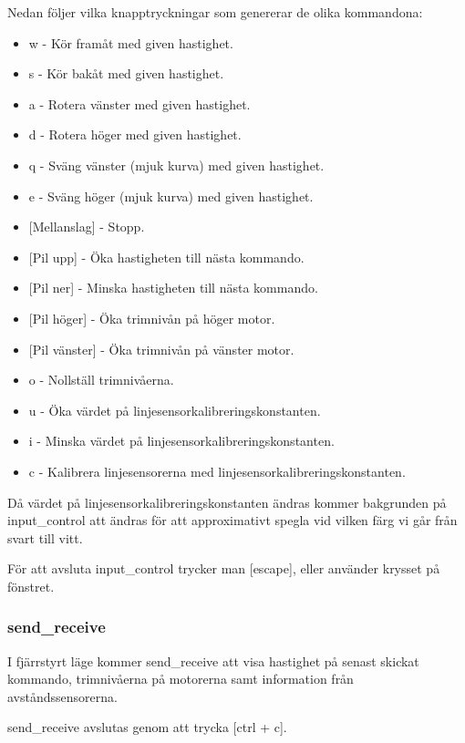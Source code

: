Nedan följer vilka knapptryckningar som genererar de olika kommandona:

\begin{itemize}
\item w - Kör framåt med given hastighet.
\item s - Kör bakåt med given hastighet.
\item a - Rotera vänster med given hastighet.
\item d - Rotera höger med given hastighet.
\item q - Sväng vänster (mjuk kurva) med given hastighet.
\item e - Sväng höger (mjuk kurva) med given hastighet.
\item {[}Mellanslag] - Stopp.

\item {[}Pil upp] - Öka hastigheten till nästa kommando.
\item {[}Pil ner] - Minska hastigheten till nästa kommando.

\item {[}Pil höger] - Öka trimnivån på höger motor.
\item {[}Pil vänster] - Öka trimnivån på vänster motor.
\item o - Nollställ trimnivåerna.

\item u - Öka värdet på linjesensorkalibreringskonstanten.
\item i - Minska värdet på linjesensorkalibreringskonstanten.
\item c - Kalibrera linjesensorerna med linjesensorkalibreringskonstanten.
\end{itemize}

Då värdet på linjesensorkalibreringskonstanten ändras kommer bakgrunden på
input\_control att ändras för att approximativt spegla vid vilken färg vi går
från svart till vitt.

För att avsluta input\_control trycker man [escape], eller använder krysset på
fönstret.

\subsubsection{send\_receive}
I fjärrstyrt läge kommer send\_receive att visa hastighet på senast skickat
kommando, trimnivåerna på motorerna samt information från avståndssensorerna.

send\_receive avslutas genom att trycka [ctrl + c].

